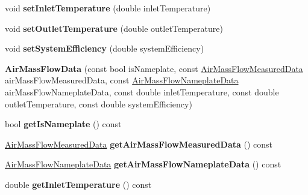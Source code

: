 \begin{DoxyCompactItemize}
\mbox{\label{class_air_mass_flow_data_acb11c2d502c8b08615f828202fea881c}} 
void {\bfseries set\+Inlet\+Temperature} (double inlet\+Temperature)
\item 
\mbox{\label{class_air_mass_flow_data_a76eabf5b08a0cf32747cb80de0f7e8a0}} 
void {\bfseries set\+Outlet\+Temperature} (double outlet\+Temperature)
\item 
\mbox{\label{class_air_mass_flow_data_ae8f2a45f436a28301373c50e80826796}} 
void {\bfseries set\+System\+Efficiency} (double system\+Efficiency)
\item 
\mbox{\label{class_air_mass_flow_data_a62c2e215cc662a436402d05e4f6b55b6}} 
{\bfseries Air\+Mass\+Flow\+Data} (const bool is\+Nameplate, const \hyperlink{class_air_mass_flow_measured_data}{Air\+Mass\+Flow\+Measured\+Data} air\+Mass\+Flow\+Measured\+Data, const \hyperlink{class_air_mass_flow_nameplate_data}{Air\+Mass\+Flow\+Nameplate\+Data} air\+Mass\+Flow\+Nameplate\+Data, const double inlet\+Temperature, const double outlet\+Temperature, const double system\+Efficiency)
\item 
\mbox{\label{class_air_mass_flow_data_aa49758b3dce624e809516d1de491a6e0}} 
bool {\bfseries get\+Is\+Nameplate} () const
\item 
\mbox{\label{class_air_mass_flow_data_ae466ca20e42fe074cf735ba8b35292b1}} 
\hyperlink{class_air_mass_flow_measured_data}{Air\+Mass\+Flow\+Measured\+Data} {\bfseries get\+Air\+Mass\+Flow\+Measured\+Data} () const
\item 
\mbox{\label{class_air_mass_flow_data_a27a801c30b89d8d24eaf99b5c181e30d}} 
\hyperlink{class_air_mass_flow_nameplate_data}{Air\+Mass\+Flow\+Nameplate\+Data} {\bfseries get\+Air\+Mass\+Flow\+Nameplate\+Data} () const
\item 
\mbox{\label{class_air_mass_flow_data_aa762f7785c199cd66f20f334888416ef}} 
double {\bfseries get\+Inlet\+Temperature} () const
\item 
\mbox{\label{class_air_mass_flow_data_a5e2bf395cd4294a11a8497b12cf6d9c2}} 

\end{DoxyCompactItemize}
